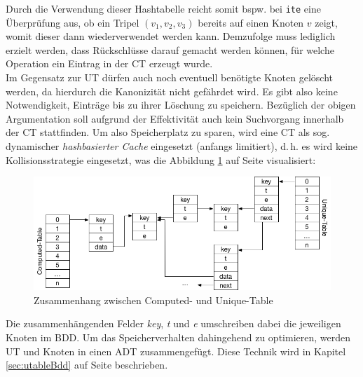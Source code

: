 Durch die Verwendung dieser Hashtabelle reicht somit bspw. bei \texttt{ite} eine Überprüfung aus, ob ein Tripel $(v_1, v_2, v_3)$ bereits auf einen Knoten $v$ zeigt, womit dieser dann wiederverwendet werden kann. Demzufolge muss lediglich erzielt werden, dass Rückschlüsse darauf gemacht werden können, für welche Operation ein Eintrag in der CT erzeugt wurde.\\
Im Gegensatz zur UT dürfen auch noch eventuell benötigte Knoten gelöscht werden, da hierdurch die Kanonizität nicht gefährdet wird. Es gibt also keine Notwendigkeit, Einträge bis zu ihrer Löschung zu speichern. Bezüglich der obigen Argumentation soll aufgrund der Effektivität auch kein Suchvorgang innerhalb der CT stattfinden. Um also Speicherplatz zu sparen, wird eine CT als sog. dynamischer \emph{hashbasierter Cache} eingesetzt (anfangs limitiert), d.\,h. es wird keine Kollisionsstrategie eingesetzt, was die Abbildung \ref{fig:uctable} auf Seite \pageref{fig:uctable} visualisiert:
\newpage
\begin{figure}[bth]
	\centering
	\includegraphics[scale=0.3]{./img/uctable}
	\caption[Zusammenhang zwischen Computed- und Unique-Table]{Zusammenhang zwischen Computed- und Unique-Table}
	\label{fig:uctable}
\end{figure}
Die zusammenhängenden Felder \textit{key}, \textit{t} und \textit{e} umschreiben dabei die jeweiligen Knoten im BDD. Um das Speicherverhalten dahingehend zu optimieren, werden UT und Knoten in einen ADT zusammengefügt. Diese Technik wird in Kapitel \ref{sec:utableBdd} auf Seite \pageref{sec:utableBdd} beschrieben.\\
